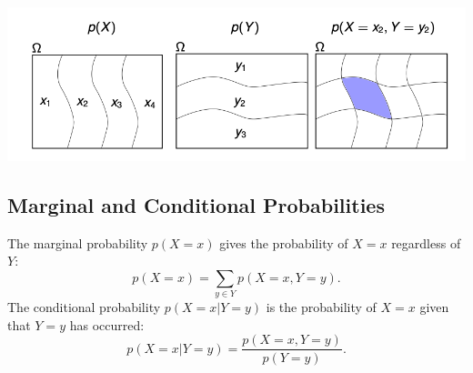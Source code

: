 \begin{center}
    \includegraphics[width=1\textwidth]{img/joint_partition.png}
\end{center}



\subsection{Marginal and Conditional Probabilities}
The marginal probability \( p(X = x) \) gives the probability of \( X = x \) regardless of \( Y \):
\[
    p(X = x) = \sum_{y \in Y} p(X = x, Y = y).
\]
The conditional probability \( p(X = x | Y = y) \) is the probability of \( X = x \) given that \( Y = y \) has occurred:
\[
    p(X = x | Y = y) = \frac{p(X = x, Y = y)}{p(Y = y)}.
\]

